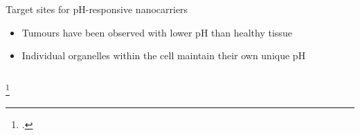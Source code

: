 \documentclass[aspectratio=169,compress]{beamer}
\newcommand*{\autotitle}{\subsecname\hfill\textbf{\small\secname}}
\begin{document}
\begin{frame}[fragile]{\autotitle}
\begin{columns}
      \begin{block}{Target sites for pH-responsive nanocarriers}
        \begin{itemize}
          \item \alert{Tumours} have been observed with lower pH than healthy tissue~
          \item Individual \alert{organelles} within the cell maintain their own unique pH~
        \end{itemize}
      \end{block}

  \end{columns}
  \footcitetext{sun2014engineered,gerweck1996cellular,tannock1989acid,wicki2015nanomedicine}
\end{frame}
\end{document}

